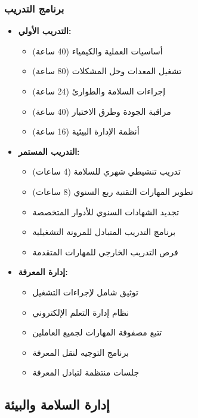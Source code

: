 \subsubsection{برنامج التدريب}
\begin{itemize}
    \item \textbf{التدريب الأولي:}
    \begin{itemize}
        \item أساسيات العملية والكيمياء (40 ساعة)
        \item تشغيل المعدات وحل المشكلات (80 ساعة)
        \item إجراءات السلامة والطوارئ (24 ساعة)
        \item مراقبة الجودة وطرق الاختبار (40 ساعة)
        \item أنظمة الإدارة البيئية (16 ساعة)
    \end{itemize}
    
    \item \textbf{التدريب المستمر:}
    \begin{itemize}
        \item تدريب تنشيطي شهري للسلامة (4 ساعات)
        \item تطوير المهارات التقنية ربع السنوي (8 ساعات)
        \item تجديد الشهادات السنوي للأدوار المتخصصة
        \item برنامج التدريب المتبادل للمرونة التشغيلية
        \item فرص التدريب الخارجي للمهارات المتقدمة
    \end{itemize}
    
    \item \textbf{إدارة المعرفة:}
    \begin{itemize}
        \item توثيق شامل لإجراءات التشغيل
        \item نظام إدارة التعلم الإلكتروني
        \item تتبع مصفوفة المهارات لجميع العاملين
        \item برنامج التوجيه لنقل المعرفة
        \item جلسات منتظمة لتبادل المعرفة
    \end{itemize}
\end{itemize}

\subsection{إدارة السلامة والبيئة}

